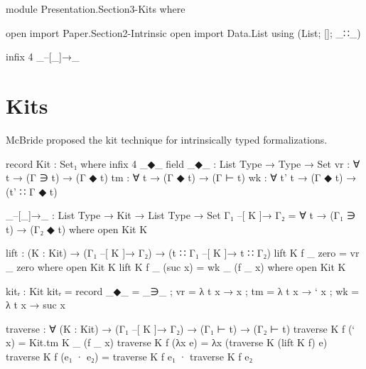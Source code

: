 \begin{code}[hide]
module Presentation.Section3-Kits where

open import Paper.Section2-Intrinsic
open import Data.List using (List; []; _∷_)

infix  4  _–[_]→_
\end{code}

\section{Kits}

\begin{frame}
McBride proposed the kit technique for intrinsically typed formalizations.
\end{frame}

\begin{frame}
\begin{code}
record Kit : Set₁ where
  infix 4 _◆_
  field
    _◆_  : List Type → Type → Set
    vr   : ∀ t → (Γ ∋ t) → (Γ ◆ t)
    tm   : ∀ t → (Γ ◆ t) → (Γ ⊢ t)
    wk   : ∀ {t'} t → (Γ ◆ t) → (t' ∷ Γ ◆ t)
\end{code}
\end{frame}

\begin{frame}
\begin{code}
_–[_]→_ : List Type → Kit → List Type → Set
Γ₁ –[ K ]→ Γ₂ = ∀ t → (Γ₁ ∋ t) → (Γ₂ ◆ t) where open Kit K

lift : (K : Kit) → (Γ₁ –[ K ]→ Γ₂) → (t ∷ Γ₁ –[ K ]→ t ∷ Γ₂)
lift K f _ zero     = vr _ zero     where open Kit K
lift K f _ (suc x)  = wk _ (f _ x)  where open Kit K
\end{code}
\end{frame}

\begin{frame}
\begin{code}
kitᵣ : Kit
kitᵣ = record {  _◆_  =  _∋_
              ;  vr   = λ t x → x
              ;  tm   = λ t x → ` x
              ;  wk   = λ t x → suc x
              }
\end{code}
\end{frame}

\begin{frame}
\begin{code}
traverse : ∀ (K : Kit) → (Γ₁ –[ K ]→ Γ₂) → (Γ₁ ⊢ t) → (Γ₂ ⊢ t)
traverse K f (` x)      = Kit.tm K _ (f _ x)
traverse K f (λx e)     = λx (traverse K (lift K f) e)
traverse K f (e₁ · e₂)  = traverse K f e₁ · traverse K f e₂
\end{code}
\end{frame}

